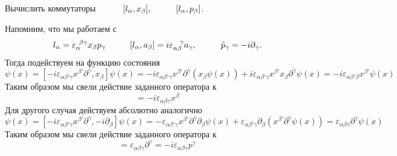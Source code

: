 \begin{leftrules}
	Вычислить коммутаторы $\hspace{1 cm} [l_\alpha, x_\beta],
		\hspace{1 cm}
		[l_\alpha, p_\beta]$.
\end{leftrules}
Напомним, что мы работаем с
\begin{equation*}
	l_\alpha = \varepsilon_{\alpha}^{\phantom{0} \beta \gamma} x_\beta p_\gamma
	\hspace{1 cm}
	[l_\alpha, a_\beta] = i \varepsilon_{\alpha \beta }^{\phantom{0}\phantom{0}\gamma} a_\gamma,
	\hspace{1 cm}
	\hat{p}_\gamma = - i \partial_\gamma.
\end{equation*}
Тогда подействуем на функцию состояния
\begin{equation*}
	[l_\alpha, x_\beta] \psi(x)= [ - i \varepsilon_{\alpha \beta' \gamma} x^{\beta'} \partial^{\gamma}, x_\beta] \psi(x)
	=
	- i \varepsilon_{\alpha \beta' \gamma} x^{\beta'} \partial^\gamma (x_\beta \psi(x)) + i \varepsilon_{\alpha \beta' \gamma} x^{\beta'} x_\beta \partial^\gamma \psi(x)
	=
	- i \varepsilon_{\alpha \beta' \beta} x^{\beta'} \psi(x)
\end{equation*}
Таким образом мы свели действие заданного оператора к
\begin{equation*}
	[l_\alpha, x_\beta] = - i \varepsilon_{\alpha \beta \gamma} x^{\beta}
\end{equation*}
Для другого случая действуем абсолютно аналогично
\begin{equation*}
	[l_\alpha, p_\beta] \psi(x)
	=
	[ - i \varepsilon_{\alpha \beta' \gamma} x^{\beta'} \partial^{\gamma}, -i \partial_\beta] \psi(x)
	=
	-\varepsilon_{\alpha \beta' \gamma} x^{\beta'} \partial^{\gamma} \partial_\beta \psi(x)
	+ \varepsilon_{\alpha \beta' \gamma} \partial_\beta (x^{\beta'} \partial^{\gamma} \psi(x))
	=
	\varepsilon_{\alpha \beta \gamma}  \partial^{\gamma} \psi(x)
\end{equation*}
Таким образом мы свели действие заданного оператора к
\begin{equation*}
	[l_\alpha, p_\beta] = \varepsilon_{\alpha \beta \gamma}  \partial^{\gamma} = - i \varepsilon_{\alpha \beta \gamma} p^\gamma
\end{equation*}